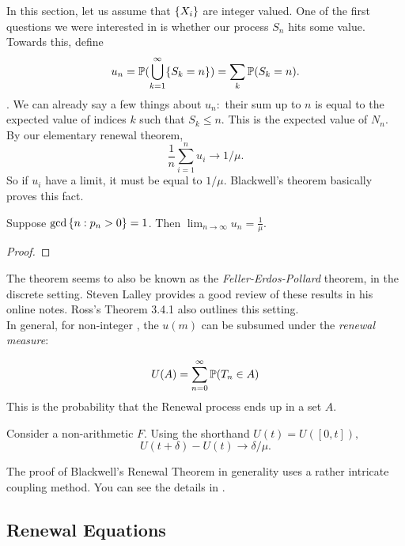 \documentclass[12pt]{article}
\begin{document}
In this section, let us assume that $\lbrace X_i \rbrace$ are integer valued. One of the first questions we were interested in is whether our process $S_n$ hits some value. Towards this, define  
\[
u_n = \mathbb{P}(\bigcup_{k = 1}^\infty \lbrace S_k = n \rbrace) = \sum_k \mathbb{P}(S_k = n).
\]
. We can already say a few things about $u_n:$ their sum up to $n$ is equal to the expected value of indices $k$ such that $S_k \leq n$. This is the expected value of $N_n.$ By our elementary renewal theorem,
\[
\frac{1}{n}\sum_{i=1}^n u_i \rightarrow 1/\mu.
\]
So if $u_i$ have a limit, it must be equal to $1/\mu$. Blackwell's theorem basically proves this fact.

\begin{theorem}
    Suppose $\gcd{\lbrace n:p_n > 0 \rbrace} = 1$. Then $\lim_{n \rightarrow \infty} u_n = \frac{1}{\mu}.$
\end{theorem}

\begin{proof}
    
\end{proof}

The theorem seems to also be known as the \textit{Feller-Erdos-Pollard} theorem, in the discrete setting. Steven Lalley provides a good review of these results in his online notes. Ross's Theorem 3.4.1 also outlines this setting. \\

In general, for non-integer , the $u(m)$ can be subsumed under the \textit{renewal measure}:

\begin{definition}
\[
U(A) = \sum_{n=0}^\infty \mathbb{P}(T_n \in A)
\]
This is the probability that the Renewal process ends up in a set $A$. 
\end{definition}

\begin{theorem}
Consider a non-arithmetic $F$. Using the shorthand $U(t) = U([0,t]),$
\[
U(t+\delta) - U(t) \rightarrow \delta/\mu.
\]
\end{theorem}

The proof of Blackwell's Renewal Theorem in generality uses a rather intricate coupling method. You can see the details in \cite{durrett2019probability}. 

\subsection{Renewal Equations}
\end{document}
